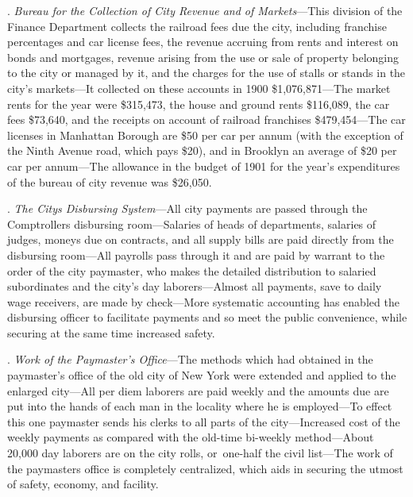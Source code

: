 \documentclass[openany,nobib]{tufte-book}
\begin{document}
. \emph{Bureau for the Collection of City Revenue and of
Markets}---This division of the Finance Department collects the railroad
fees due the city, including franchise percentages and car license fees,
the revenue accruing from rents and interest on bonds and mortgages,
revenue arising from the use or sale of property belonging to the city
or managed by it, and the charges for the use of stalls or stands in the
city's markets---It collected on these accounts in 1900
\$1,076,871---The market rents for the year were \$315,473, the house
and ground rents \$116,089, the car fees \$73,640, and the receipts on
account of railroad franchises \$479,454---The car licenses in Manhattan
Borough are \$50 per car per annum (with the exception of the Ninth
Avenue road, which pays \$20), and in Brooklyn an average of \$20 per
car per annum---The allowance in the budget of 1901 for the year's
expenditures of the bureau of city revenue was \$26,050.~

\vspace{.15in}

.\emph{ The City\textquotesingle s Disbursing System}---All city
payments are passed through the Comptroller\textquotesingle s disbursing
room---Salaries of heads of departments, salaries of judges, moneys due
on contracts, and all supply bills are paid directly from the disbursing
room---All payrolls pass through it and are paid by warrant to the order
of the city paymaster, who makes the detailed distribution to salaried
subordinates and the city's day laborers---Almost all payments, save to
daily wage receivers, are made by check---More systematic accounting has
enabled the disbursing officer to facilitate payments and so meet the
public convenience, while securing at the same time increased safety.~

\vspace{.15in}

. \emph{Work of the Paymaster's Office}---The methods which had
obtained in the paymaster's office of the old city of New York were
extended and applied to the enlarged city---All per diem laborers are
paid weekly and the amounts due are put into the hands of each man in
the locality where he is employed---To effect this one paymaster sends
his clerks to all parts of the city---Increased cost of the weekly
payments as compared with the old-time bi-weekly method---About 20,000
day laborers are on the city rolls, or~one-half the civil list---The
work of the paymaster\textquotesingle s office is completely
centralized, which aids in securing the utmost of safety, economy, and
facility.~
\end{document}
